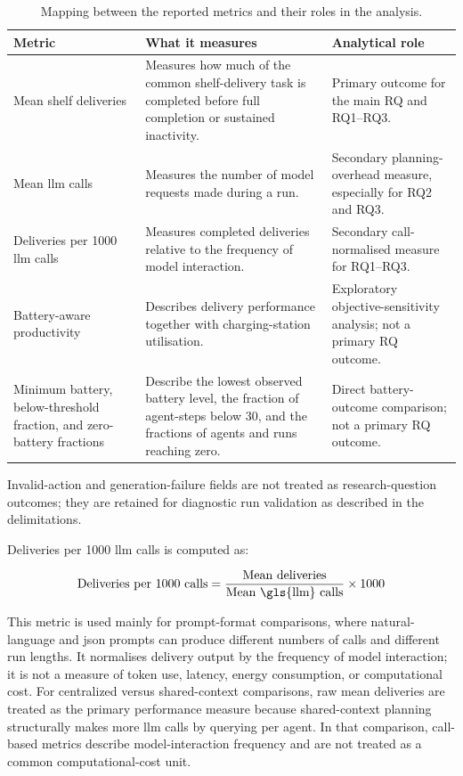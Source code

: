 \begin{table}[H]
\centering
\small
\setlength{\tabcolsep}{4pt}
\begin{tabular}{|p{}|p{}|p{}|}
\hline
\textbf{Metric} & \textbf{What it measures} & \textbf{Analytical role} \\
\hline
Mean shelf deliveries & Measures how much of the common shelf-delivery task is completed before full completion or sustained inactivity. & Primary outcome for the main RQ and RQ1--RQ3. \\
\hline
Mean \gls{llm} calls & Measures the number of model requests made during a run. & Secondary planning-overhead measure, especially for RQ2 and RQ3. \\
\hline
Deliveries per 1000 \gls{llm} calls & Measures completed deliveries relative to the frequency of model interaction. & Secondary call-normalised measure for RQ1--RQ3. \\
\hline
Battery-aware productivity & Describes delivery performance together with charging-station utilisation. & Exploratory objective-sensitivity analysis; not a primary RQ outcome. \\
\hline
Minimum battery, below-threshold fraction, and zero-battery fractions & Describe the lowest observed battery level, the fraction of agent-steps below 30, and the fractions of agents and runs reaching zero. & Direct battery-outcome comparison; not a primary RQ outcome. \\
\hline
\end{tabular}
\caption{Mapping between the reported metrics and their roles in the analysis.}
\label{tab:metric-rq-mapping}
\end{table}

Invalid-action and generation-failure fields are not treated as research-question outcomes; they are retained for diagnostic run validation as described in the delimitations.

Deliveries per 1000 \gls{llm} calls is computed as:

\begin{equation}
    \text{Deliveries per 1000 calls} =
    \frac{\text{Mean deliveries}}{\text{Mean \gls{llm} calls}} \times 1000
    \label{eq:deliveries-per-1000-calls}
\end{equation}

This metric is used mainly for prompt-format comparisons, where natural-language and \gls{json} prompts can produce different numbers of calls and different run lengths.
It normalises delivery output by the frequency of model interaction; it is not a measure of token use, latency, energy consumption, or computational cost.
For centralized versus shared-context comparisons, raw mean deliveries are treated as the primary performance measure because shared-context planning structurally makes more \gls{llm} calls by querying per agent.
In that comparison, call-based metrics describe model-interaction frequency and are not treated as a common computational-cost unit.

